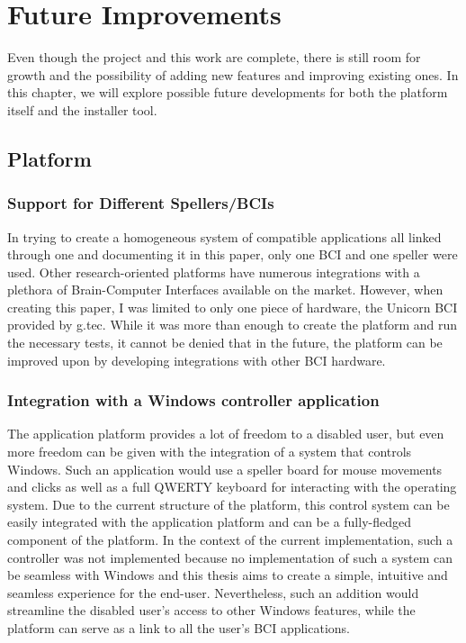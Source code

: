 
\chapter{Future Improvements}\label{cap:future}
Even though the project and this work are complete, there is still room for growth and the possibility of adding new features and improving existing ones. In this chapter, we will explore possible future developments for both the platform itself and the installer tool.

\section{Platform}
\subsection{Support for Different Spellers/BCIs}
In trying to create a homogeneous system of compatible applications all linked through one and documenting it in this paper, only one BCI and one speller were used. Other research-oriented platforms have numerous integrations with a plethora of Brain-Computer Interfaces available on the market. However, when creating this paper, I was limited to only one piece of hardware, the Unicorn BCI provided by g.tec. While it was more than enough to create the platform and run the necessary tests, it cannot be denied that in the future, the platform can be improved upon by developing integrations with other BCI hardware.

\subsection{Integration with a Windows controller application}
The application platform provides a lot of freedom to a disabled user, but even more freedom can be given with the integration of a system that controls Windows. Such an application would use a speller board for mouse movements and clicks as well as a full QWERTY keyboard for interacting with the operating system. Due to the current structure of the platform, this control system can be easily integrated with the application platform and can be a fully-fledged component of the platform.
\vspace{\baselineskip}\newline
In the context of the current implementation, such a controller was not implemented because no implementation of such a system can be seamless with Windows and this thesis aims to create a simple, intuitive and seamless experience for the end-user. Nevertheless, such an addition would streamline the disabled user's access to other Windows features, while the platform can serve as a link to all the user's BCI applications. 



